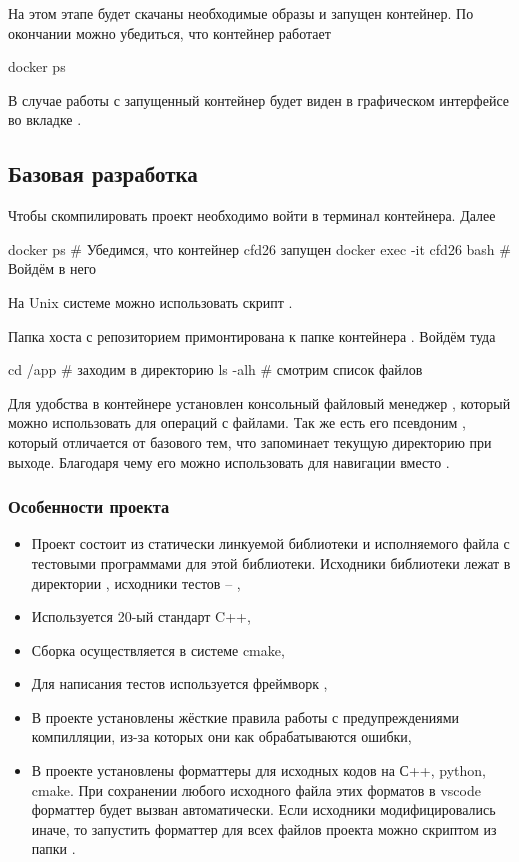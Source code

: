 На этом этапе будет скачаны необходимые образы и запущен контейнер.
По окончании можно убедиться, что контейнер работает
\begin{shelloutput}
docker ps
\end{shelloutput}
В случае работы с  запущенный контейнер будет виден в графическом интерфейсе во вкладке .

\subsection{Базовая разработка}
\label{sec:howto_basic_dev}
Чтобы скомпилировать проект необходимо войти в терминал контейнера.
Далее
\begin{shelloutput}
docker ps                   # Убедимся, что контейнер cfd26 запущен
docker exec -it cfd26 bash  # Войдём в него
\end{shelloutput}

На Unix системе можно использовать скрипт .

Папка хоста с репозиторием  примонтирована к папке контейнера .
Войдём туда
\begin{shelloutput}
cd /app   # заходим в директорию
ls -alh   # смотрим список файлов
\end{shelloutput}
Для удобства в контейнере установлен консольный файловый менеджер ,
который можно использовать для операций с файлами. Так же есть его псевдоним ,
который отличается от базового  тем, что запоминает текущую директорию при выходе.
Благодаря чему его можно использовать для навигации вместо .


\subsubsection{Особенности проекта}
\begin{itemize}
\item Проект состоит из статически линкуемой библиотеки  и исполняемого файла  с тестовыми программами для этой библиотеки.
      Исходники библиотеки лежат в директории , исходники тестов -- ,
\item Используется 20-ый стандарт C++,
\item Сборка осуществляется в системе cmake,
\item Для написания тестов используется фреймворк ,
\item В проекте установлены жёсткие правила работы с предупреждениями компилляции, из-за которых они как обрабатываются ошибки,
\item В проекте установлены форматтеры для исходных кодов на С++, python, cmake. При сохранении любого исходного файла этих форматов в vscode
      форматтер будет вызван автоматически. Если исходники модифицировались иначе, то запустить форматтер для всех файлов проекта
      можно скриптом  из папки .
\end{itemize}

